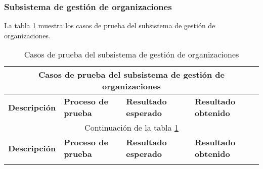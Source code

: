 \begin{landscape}
\begin{longtable}[c]{|p{50mm}|p{50mm}|p{50mm}|p{50mm}|}
	 	 \end{longtable}
\end{landscape}


\begin{landscape}
	 \subsubsection{Subsistema de gestión de organizaciones}
	 	La tabla \ref{table:casos_prueba_organizaciones} muestra los casos de prueba del subsistema de gestión de organizaciones.
	 	
	 	\begin{longtable}[c]{|p{50mm}|p{50mm}|p{50mm}|p{50mm}|}
	 	 \caption{Casos de prueba del subsistema de gestión de organizaciones\label{table:casos_prueba_organizaciones}}\\
	 	
	 	 \hline
	 	 \multicolumn{4}{|c|}{\textbf{Casos de prueba del subsistema de gestión de organizaciones}}\\
	 	 \hline
	 	 \textbf{Descripción} & \textbf{Proceso de prueba} & \textbf{Resultado esperado} & \textbf{Resultado obtenido}\\
	 	 \hline
	 	 \hline
	 	 \endfirsthead
	 	 
	 	 \hline
	 	 \multicolumn{4}{|c|}{Continuación de la tabla \ref{table:casos_prueba_organizaciones}}\\
	 	 \hline
	 	 \textbf{Descripción} & \textbf{Proceso de prueba} & \textbf{Resultado esperado} & \textbf{Resultado obtenido}\\
	 	 \hline
	 	 \hline
	 	 \endhead
	 	 
	 	 \hline
	 	 \endfoot
	 	 

\end{longtable}
\end{landscape}
